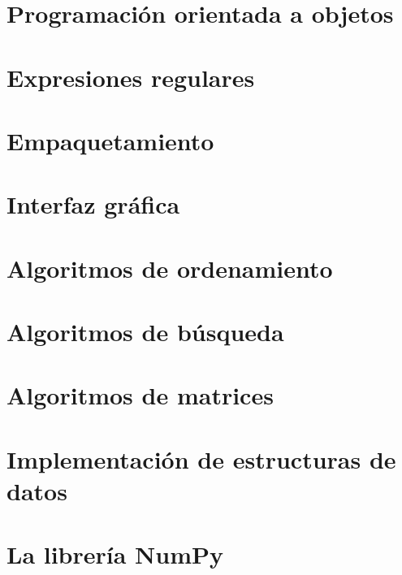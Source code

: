 \documentclass{article}
\begin{document}
    \section{Programación orientada a objetos}

    \section{Expresiones regulares}

    \section{Empaquetamiento}

    \section{Interfaz gráfica}

    \section{Algoritmos de ordenamiento}

    \section{Algoritmos de búsqueda}

    \section{Algoritmos de matrices}

    \section{Implementación de estructuras de datos}

    \section{La librería NumPy}
\end{document}
